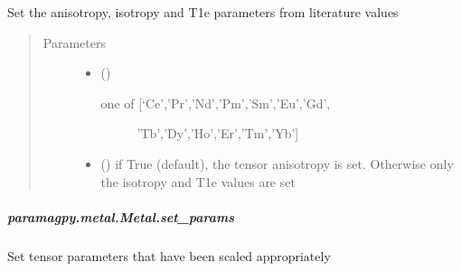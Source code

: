 \documentclass[a4paper,10pt,english,openany,oneside]{sphinxmanual}
\begin{document}
\begin{fulllineitems}
\begin{fulllineitems}
\begin{fulllineitems}
\label{\detokenize{reference/generated/paramagpy.metal.Metal.set_lanthanide:paramagpy.metal.Metal.set_lanthanide}}
Set the anisotropy, isotropy and T1e parameters from
literature values
\begin{quote}\begin{description}
\item[{Parameters}] \leavevmode\begin{itemize}
\item {} 
 () \textendash{} \begin{description}
\item[{one of {[}‘Ce’,’Pr’,’Nd’,’Pm’,’Sm’,’Eu’,’Gd’,}] \leavevmode
’Tb’,’Dy’,’Ho’,’Er’,’Tm’,’Yb’{]}

\end{description}


\item {} 
 (\sphinxstyleliteralemphasis{\sphinxupquote{ (}}\sphinxstyleliteralemphasis{\sphinxupquote{)}}) \textendash{} if True (default), the tensor anisotropy is set.
Otherwise only the isotropy and T1e values are set

\end{itemize}

\end{description}\end{quote}

\end{fulllineitems}



\subparagraph{paramagpy.metal.Metal.set\_params}
\label{\detokenize{reference/generated/paramagpy.metal.Metal.set_params:paramagpy-metal-metal-set-params}}\label{\detokenize{reference/generated/paramagpy.metal.Metal.set_params::doc}}

\begin{fulllineitems}
\label{\detokenize{reference/generated/paramagpy.metal.Metal.set_params:paramagpy.metal.Metal.set_params}}
Set tensor parameters that have been scaled appropriately


\end{fulllineitems}
\end{fulllineitems}
\end{fulllineitems}
\end{document}
